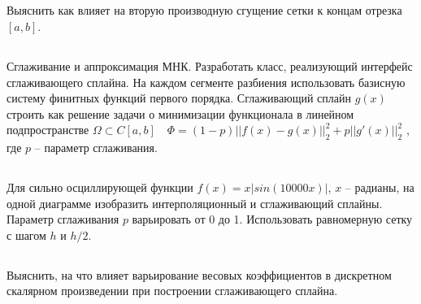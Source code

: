 \subsection{}
Выяснить как влияет на вторую производную сгущение сетки к концам отрезка \([a,b]\).

\subsection{}
Сглаживание и аппроксимация МНК. Разработать класс, реализующий интерфейс сглаживающего сплайна. На каждом сегменте разбиения использовать базисную систему финитных функций первого порядка. Сглаживающий сплайн \(g(x)\) строить как решение задачи о минимизации функционала в линейном подпространстве \(\Omega \subset C[a,b] \hspace{1em} \Phi=(1−p)||f(x)−g(x)||^2_2+p||g'(x)||^2_2\)
, где \(p\) – параметр сглаживания.

\subsection{}
Для сильно осциллирующей функции \(f(x)=x|sin(10000x)|\), \(x\) – радианы, на одной диаграмме изобразить интерполяционный и сглаживающий сплайны. Параметр сглаживания \(p\) варьировать от 0 до 1. Использовать равномерную сетку с шагом \(h\) и \(h/2\).

\subsection{}
Выяснить, на что влияет варьирование весовых коэффициентов в дискретном скалярном произведении при построении сглаживающего сплайна.
